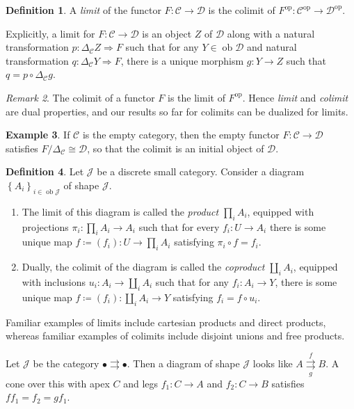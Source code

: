 \documentclass[10pt,letterpaper,cm]{nupset}
\theoremstyle{definition}
\newtheorem{definition}{Definition}[section]
\newtheorem{exmp}[definition]{Example}
\theoremstyle{theorem}
\theoremstyle{remark}
\newtheorem{remark}[definition]{Remark}
\newcommand{\1}{\mathbf{1}}
\renewcommand{\c}{\mathscr{C}}
\renewcommand{\d}{\mathscr{D}}
\renewcommand{\j}{\mathscr{J}}
\newcommand{\0}{\vec 0}
\DeclareMathOperator{\op}{op}
\DeclareMathOperator{\ob}{ob}
\begin{document}
\begin{definition}
A \textit{limit} of the functor $F: \c \to \d$ is  the colimit of $F^{\op} : \c^{\op} \to \d^{\op}$.
\end{definition}


Explicitly,  a limit for $F: \c \to \d$ is an object $Z$ of $\d$ along with a natural transformation $p: \Delta_{\c}Z \Rightarrow F$ such that for any $Y \in \ob \d$ and natural transformation $q: \Delta_{\c}Y \Rightarrow F$, there is a unique morphism $g: Y \to Z$ such that $ q= p \circ \Delta_{\c}g$.


\begin{remark}
The colimit of a functor $F$ is the limit of $F^{\op}$. Hence \textit{limit} and \textit{colimit} are dual properties, and our results so far for colimits can be dualized  for limits.
\end{remark}

\begin{exmp}
If $\c$ is the empty category, then the empty functor $F: \c \to \d$ satisfies $F/\Delta_{\c}\cong \d$, so that the colimit is an initial object of $\d$.
\end{exmp}

\begin{definition}
Let $\j$ be a discrete small category. Consider a diagram  $\left\{A_i\right\}_{i\in \ob{\j}}$ of shape $\j$. 
\begin{enumerate}
\item The limit of this diagram is called the \textit{product} $\prod_i A_i$, equipped with projections $\pi_i : \prod_i A_i \to A_i$ such that for every $f_{i} : U \to A_i$ there is some unique map $f\coloneqq \left(f_i\right) : U \to \prod_i A_i$ satisfying $\pi_i \circ f = f_i$. 
\item  Dually, the colimit of the diagram is called the \textit{coproduct} $\coprod_i A_i$, equipped with inclusions $u_i : A_i \to \coprod_i A_i$ such that for any $f_i : A_i \to Y$, there is some unique map $f\coloneqq \left(f_i\right) : \coprod_i A_i \to Y$ satisfying $f_i = f \circ u_i$.
\end{enumerate}
\end{definition}

\smallskip

Familiar examples of limits include cartesian products and direct products, whereas familiar examples of colimits include disjoint unions and free products. 


\smallskip

Let $\j$ be the category $\bullet \rightrightarrows \bullet$. Then  a diagram of shape $\j$ looks like $A \overset{f}{\underset{g}{\rightrightarrows}} B$. A cone over this with apex $C$ and legs $f_1 : C \to A$ and $f_2 : C \to B$ satisfies $ff_1=f_2 = gf_1$.
\end{document}
